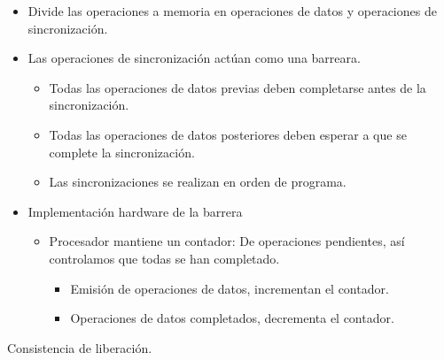 \documentclass[12pt, twoside, openright]{report} %
\begin{document}
\begin{itemize}

	\item Divide las operaciones a memoria en operaciones de datos y
	      operaciones de sincronización.
	\item Las operaciones de sincronización actúan como una barreara.

	      \begin{itemize}

		      \item Todas las operaciones de datos previas deben completarse antes
		            de la sincronización.
		      \item Todas las operaciones de datos posteriores deben esperar a que
		            se complete la sincronización.
		      \item Las sincronizaciones se realizan en orden de programa.
	      \end{itemize}
	\item Implementación hardware de la barrera

	      \begin{itemize}

		      \item Procesador mantiene un contador: De operaciones pendientes,
		            así controlamos que todas se han completado.

		            \begin{itemize}

			            \item Emisión de operaciones de datos, incrementan el contador.
			            \item Operaciones de datos completados, decrementa el contador.
		            \end{itemize}
	      \end{itemize}
\end{itemize}
\pagebreak
Consistencia de liberación.
\end{document}
